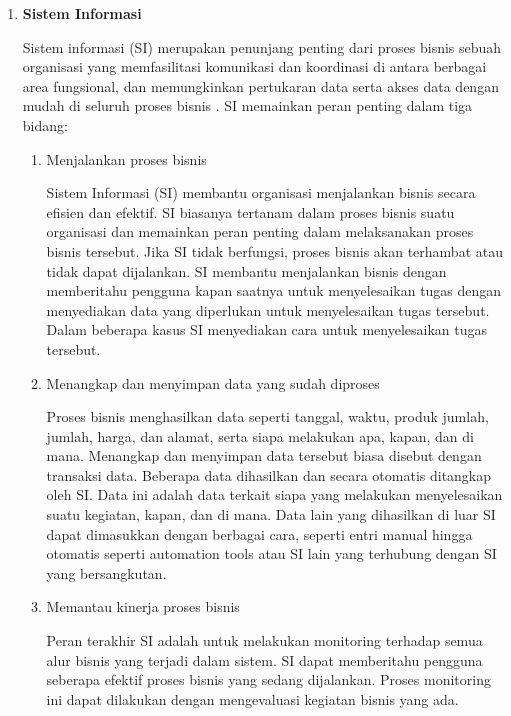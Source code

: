 \documentclass[12pt]{article}
\newcommand{\listsection}[1]{
    \item \textbf{#1}
    \addcontentsline{toc}{subsection}{#1}
}
\begin{document}
\begin{enumerate}[label=\textbf{3.\arabic*}]
    \listsection{Sistem Informasi}
    
    Sistem informasi (SI) merupakan penunjang penting dari proses bisnis sebuah organisasi yang memfasilitasi komunikasi dan koordinasi di antara berbagai area fungsional, dan memungkinkan pertukaran data serta akses data dengan mudah di seluruh proses bisnis \cite{rainer2004}. SI memainkan peran penting dalam tiga bidang:

    \begin{enumerate}[label=\arabic*.]
        \item Menjalankan proses bisnis
        
        Sistem Informasi (SI) membantu organisasi menjalankan bisnis secara efisien dan efektif. SI biasanya tertanam dalam proses bisnis suatu organisasi dan memainkan peran penting dalam melaksanakan proses bisnis tersebut. Jika SI tidak berfungsi, proses bisnis akan terhambat atau tidak dapat dijalankan. SI membantu menjalankan bisnis dengan memberitahu pengguna kapan saatnya untuk menyelesaikan tugas dengan menyediakan data yang diperlukan untuk menyelesaikan tugas tersebut. Dalam beberapa kasus SI menyediakan cara untuk menyelesaikan tugas tersebut.


        \item Menangkap dan menyimpan data yang sudah diproses 
        
        Proses bisnis menghasilkan data seperti tanggal, waktu, produk jumlah, jumlah, harga, dan alamat, serta siapa melakukan apa, kapan, dan di mana. Menangkap dan menyimpan data tersebut biasa disebut dengan transaksi data. Beberapa data dihasilkan dan secara otomatis ditangkap oleh SI. Data ini adalah data terkait siapa yang melakukan menyelesaikan suatu kegiatan, kapan, dan di mana. Data lain yang dihasilkan di luar SI dapat dimasukkan dengan berbagai cara, seperti entri manual hingga otomatis seperti automation tools atau SI lain yang terhubung dengan SI yang bersangkutan.

        \item Memantau kinerja proses bisnis
        
        Peran terakhir SI adalah untuk melakukan monitoring terhadap semua alur bisnis yang terjadi dalam sistem. SI dapat memberitahu pengguna seberapa efektif proses bisnis yang sedang dijalankan. Proses monitoring ini dapat dilakukan dengan mengevaluasi kegiatan bisnis yang ada.

    \end{enumerate}


\end{enumerate}
\end{document}
